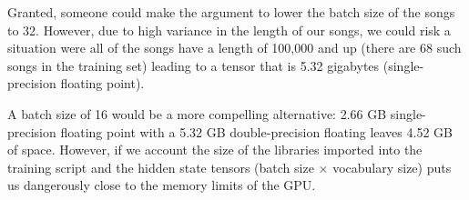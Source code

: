 \documentclass[a4paper]{book}
\begin{document}
Granted, someone could make the argument to lower the batch size of the songs to 32. However, due to high variance in the length of our songs, we could risk a situation were all of the songs have a length of 100,000 and up (there are 68 such songs in the training set) leading to a tensor that is 5.32 gigabytes (single-precision floating point).

A batch size of 16 would be a more compelling alternative: 2.66 GB single-precision floating point with a 5.32 GB double-precision floating leaves 4.52 GB of space. However, if we account the size of the libraries imported into the training script and the hidden state tensors (batch size $\times$ vocabulary size) puts us dangerously close to the memory limits of the GPU.

\end{document}
